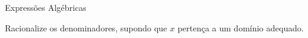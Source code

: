 \begin{exercicios}{Expressões Algébricas}
    \begin{exercicio}
        Racionalize os denominadores, supondo que $x$ pertença a um domínio adequado.
        \begin{mathlist}[2]
            \item {}
            \item {}
            \item {}
            \item {}
            \item {}
            \item {}
        \end{mathlist}      
    \end{exercicio}
    
    
    
    
\end{exercicios}

